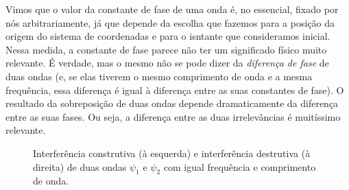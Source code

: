 Vimos que o valor da constante de fase de uma onda é, no essencial, fixado
por nós arbitrariamente, já que depende da escolha que fazemos para a posição da
origem do sistema de coordenadas e para o isntante que consideramos inicial.
Nessa medida, a constante de fase parece não ter um significado físico muito
relevante. É verdade, mas o mesmo não se pode dizer da \emph{diferença de fase}
de duas ondas (e, se elas tiverem o mesmo comprimento de onda e a mesma
frequência, essa diferença é igual à diferença entre as suas constantes de
fase). O resultado da sobreposição de duas ondas depende dramaticamente da
diferença entre as suas fases. Ou seja, a diferença entre as duas irrelevâncias
é muitíssimo relevante.
\begin{figure}[htb]
  {\centering
    \par
  }
  \caption{Interferência construtiva (à esquerda) e interferência destrutiva (à
  direita) de duas ondas $\psi_1$ e $\psi_2$ com igual frequência e comprimento
  de onda.\label{fig:icd}}
\end{figure}

